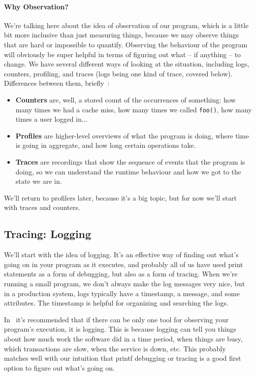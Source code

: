 \paragraph{Why Observation?} We're talking here about the idea of observation of our program, which is a little bit more inclusive than just measuring things, because we may observe things that are hard or impossible to quantify. Observing the behaviour of the program will obviously be super helpful in terms of figuring out what -- if anything -- to change. We have several different ways of looking at the situation, including logs, counters, profiling, and traces (logs being one kind of trace, covered below). Differences between them, briefly~\cite{usd}:

\begin{itemize}
	\item \textbf{Counters} are, well, a stored count of the occurrences of something: how many times we had a cache miss, how many times we called \texttt{foo()}, how many times a user logged in...
	\item \textbf{Profiles} are higher-level overviews of what the program is doing, where time is going in aggregate, and how long certain operations take.
	\item \textbf{Traces} are recordings that show the sequence of events that the program is doing, so we can understand the runtime behaviour and how we got to the state we are in.
\end{itemize}

We'll return to profilers later, because it's a big topic, but for now we'll start with traces and counters.

\subsection*{Tracing: Logging}
We'll start with the idea of logging. It's an effective way of finding out what's going on in your program as it executes, and probably all of us have used print statements as a form of debugging, but also as a form of tracing. When we're running a small program, we don't always make the log messages very nice, but in a production system, logs typically have a timestamp, a message, and some attributes. The timestamp is helpful for organizing and searching the logs. 

In~\cite{usd} it's recommended that if there can be only one tool for observing your program's execution, it is logging. This is because logging can tell you things about how much work the software did in a time period, when things are busy, which transactions are slow, when the service is down, etc. This probably matches well with our intuition that printf debugging or tracing is a good first option to figure out what's going on.


